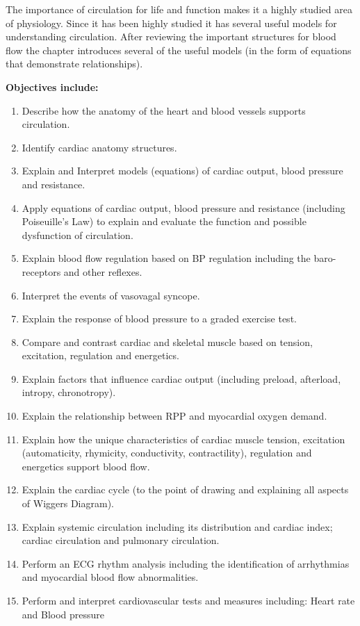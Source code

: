 The importance of circulation for life and function makes it a highly studied area of physiology. Since it has been highly studied it has several useful models for understanding circulation. After reviewing the important structures for blood flow the chapter introduces several of the useful models (in the form of equations that demonstrate relationships).


\vspace{5mm}

\textbf{Objectives include:}
\begin{enumerate}
    \item Describe how the anatomy of the heart and blood vessels supports circulation. 
    \item Identify cardiac anatomy structures.
    \item Explain and Interpret models (equations) of cardiac output, blood pressure and resistance.
    \item Apply equations of cardiac output, blood pressure and resistance (including Poiseuille's Law) to explain and evaluate the function and possible dysfunction of circulation.
    \item Explain blood flow regulation based on BP regulation including the baro-receptors and other reflexes.
    \item Interpret the events of vasovagal syncope.
    \item Explain the response of blood pressure to a graded exercise test.
    \item Compare and contrast cardiac and skeletal muscle based on tension, excitation, regulation and energetics.
    \item Explain factors that influence cardiac output (including preload, afterload, intropy, chronotropy).
    \item Explain the relationship between RPP and myocardial oxygen demand.
    \item Explain how the unique characteristics of cardiac muscle tension, excitation (automaticity, rhymicity, conductivity, contractility), regulation and energetics support blood flow.
    \item Explain the cardiac cycle (to the point of drawing and explaining all aspects of Wiggers Diagram).
    \item Explain systemic circulation including its distribution and cardiac index; cardiac circulation and pulmonary circulation.
    \item Perform an ECG rhythm analysis including the identification of arrhythmias and myocardial blood flow abnormalities.
    \item Perform and interpret cardiovascular tests and measures including: Heart rate and Blood pressure
\end{enumerate}

